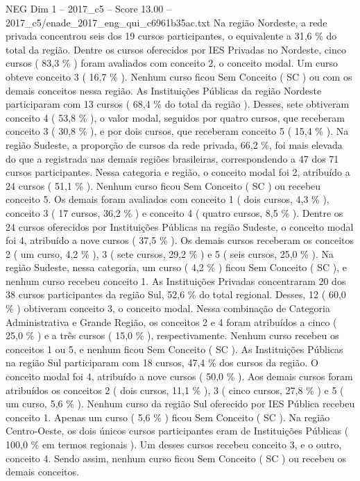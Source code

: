 \begin{textsample}{NEG Dim 1 – 2017\_c5 – Score 13.00 – 2017\_c5/enade\_2017\_eng\_qui\_c6961b35ac.txt}
Na região Nordeste, a rede privada concentrou seis dos 19 cursos participantes, o equivalente a 31,6 \% do total da região.
Dentre os cursos oferecidos por IES Privadas no Nordeste, cinco cursos ( 83,3 \% ) foram avaliados com conceito 2, o conceito modal.
Um curso obteve conceito 3 ( 16,7 \% ).
Nenhum curso ficou Sem Conceito ( SC ) ou com os demais conceitos nessa região.
As Instituições Públicas da região Nordeste participaram com 13 cursos ( 68,4 \% do total da região ).
Desses, sete obtiveram conceito 4 ( 53,8 \% ), o valor modal, seguidos por quatro cursos, que receberam conceito 3 ( 30,8 \% ), e por dois cursos, que receberam conceito 5 ( 15,4 \% ).
Na região Sudeste, a proporção de cursos da rede privada, 66,2 \%, foi mais elevada do que a registrada nas demais regiões brasileiras, correspondendo a 47 dos 71 cursos participantes.
Nessa categoria e região, o conceito modal foi 2, atribuído a 24 cursos ( 51,1 \% ).
Nenhum curso ficou Sem Conceito ( SC ) ou recebeu conceito 5.
Os demais foram avaliados com conceito 1 ( dois cursos, 4,3 \% ), conceito 3 ( 17 cursos, 36,2 \% ) e conceito 4 ( quatro cursos, 8,5 \% ).
Dentre os 24 cursos oferecidos por Instituições Públicas na região Sudeste, o conceito modal foi 4, atribuído a nove cursos ( 37,5 \% ).
Os demais cursos receberam os conceitos 2 ( um curso, 4,2 \% ), 3 ( sete cursos, 29,2 \% ) e 5 ( seis cursos, 25,0 \% ).
Na região Sudeste, nessa categoria, um curso ( 4,2 \% ) ficou Sem Conceito ( SC ), e nenhum curso recebeu conceito 1.
As Instituições Privadas concentraram 20 dos 38 cursos participantes da região Sul, 52,6 \% do total regional.
Desses, 12 ( 60,0 \% ) obtiveram conceito 3, o conceito modal.
Nessa combinação de Categoria Administrativa e Grande Região, os conceitos 2 e 4 foram atribuídos a cinco ( 25,0 \% ) e a três cursos ( 15,0 \% ), respectivamente.
Nenhum curso recebeu os conceitos 1 ou 5, e nenhum ficou Sem Conceito ( SC ).
As Instituições Públicas na região Sul participaram com 18 cursos, 47,4 \% dos cursos da região.
O conceito modal foi 4, atribuído a nove cursos ( 50,0 \% ).
Aos demais cursos foram atribuídos os conceitos 2 ( dois cursos, 11,1 \% ), 3 ( cinco cursos, 27,8 \% ) e 5 ( um curso, 5,6 \% ).
Nenhum curso da região Sul oferecido por IES Pública recebeu conceito 1.
Apenas um curso ( 5,6 \% ) ficou Sem Conceito ( SC ).
Na região Centro-Oeste, os dois únicos cursos participantes eram de Instituições Públicas ( 100,0 \% em termos regionais ).
Um desses cursos recebeu conceito 3, e o outro, conceito 4.
Sendo assim, nenhum curso ficou Sem Conceito ( SC ) ou recebeu os demais conceitos.

\end{textsample}
